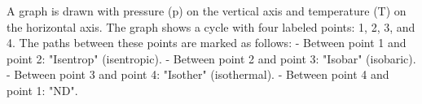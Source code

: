 A graph is drawn with pressure (p) on the vertical axis and temperature (T) on the horizontal axis. The graph shows a cycle with four labeled points: 1, 2, 3, and 4. The paths between these points are marked as follows:  
- Between point 1 and point 2: "Isentrop" (isentropic).  
- Between point 2 and point 3: "Isobar" (isobaric).  
- Between point 3 and point 4: "Isother" (isothermal).  
- Between point 4 and point 1: "ND".